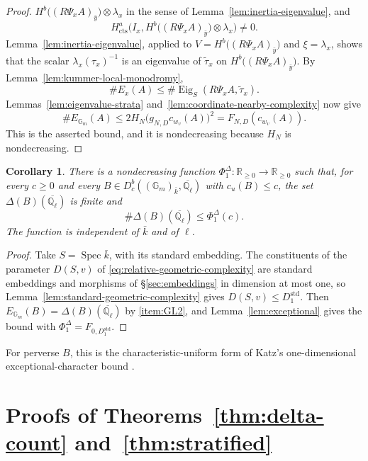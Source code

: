 \documentclass[12pt,reqno]{amsart}
\theoremstyle{definition}
\theoremstyle{plain}
\newtheorem{cor}[para]{Corollary}
\theoremstyle{definition}
\theoremstyle{remark}
\newcommand{\bbG}{\mathbb{G}}  \newcommand{\bbH}{\mathbb{H}}
\newcommand{\bbQ}{\mathbb{Q}}  \newcommand{\bbR}{\mathbb{R}}
\newcommand{\ol}[1]{\overline{#1}}
\newcommand{\Ql}{\bbQ_{\ell}}
\newcommand{\Db}{D^b_c}
\newcommand{\Gm}{\bbG_m}
\newcommand{\cu}{c_u}
\newcommand{\Eig}{\operatorname{Eig}}
\begin{document}
\begin{proof}
\(H^b\bigl((R\Psi_x A)_{\bar y}\bigr)\otimes\lambda_x\) in the sense of
Lemma~\ref{lem:inertia-eigenvalue}, and
\[
        H^a_{\mathrm{cts}}\bigl(I_x,H^b\bigl((R\Psi_x A)_{\bar y}\bigr)\otimes\lambda_x\bigr)\neq0.
\]
Lemma~\ref{lem:inertia-eigenvalue}, applied to \(V=H^b\bigl((R\Psi_x A)_{\bar y}\bigr)\) and
\(\xi=\lambda_x\), shows that the scalar
\(\lambda_x(\tau_x)^{-1}\) is an eigenvalue of \(\widetilde\tau_x\) on
\(H^b\bigl((R\Psi_x A)_{\bar y}\bigr)\).  By Lemma~\ref{lem:kummer-local-monodromy},
\[
        \#E_x(A)\le
        \#\Eig_S(R\Psi_x A,\widetilde\tau_x).
\]
Lemmas~\ref{lem:eigenvalue-strata} and~\ref{lem:coordinate-nearby-complexity} now give
\[
 \#E_{\Gm}(A)
 \le 2H_N\bigl(g_{N,D}c_{w_v}(A)\bigr)^2
 =F_{N,D}(c_{w_v}(A)).
\]
This is the asserted bound, and it is nondecreasing because \(H_N\) is nondecreasing.
\end{proof}

\begin{cor}
\label{cor:d-one}
There is a nondecreasing function
\(\Phi^\Delta_{1}:\mathbb R_{\ge0}\to\mathbb R_{\ge0}\) such that, for every \(c\ge0\) and
every \(B\in\Db((\Gm)_{\bar k},\ol\Ql)\) with \(\cu(B)\le c\), the set \(\Delta(B)(\ol\Ql)\) is finite and
\[
        \#\Delta(B)(\ol\Ql)\le\Phi^\Delta_{1}(c).
\]
The function is independent of \(\bar k\) and of \(\ell\).
\end{cor}

\begin{proof}
Take \(S=\operatorname{Spec}\bar k\), with its standard embedding.  The constituents of the parameter
\(D(S,v)\) of \eqref{eq:relative-geometric-complexity} are standard embeddings and morphisms of
\S\ref{sec:embeddings} in dimension at most one, so Lemma~\ref{lem:standard-geometric-complexity} gives
\(D(S,v)\le D_1^{\mathrm{std}}\).  Then \(E_{\Gm}(B)=\Delta(B)(\ol\Ql)\) by \ref{item:GL2}, and
Lemma~\ref{lem:exceptional} gives the bound with \(\Phi^\Delta_{1}=F_{0,D_1^{\mathrm{std}}}\).
\end{proof}

For perverse \(B\), this is the characteristic-uniform form of Katz's one-dimensional exceptional-character
bound \cite[Ch.~1]{Katz2012}.

\section{Proofs of Theorems~\ref{thm:delta-count} and~\ref{thm:stratified}}
\label{sec:counting}
\end{document}
